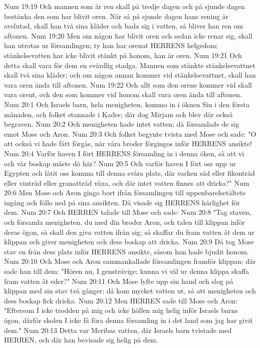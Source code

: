 Num 19:19  Och mannen som är ren skall på tredje dagen och på sjunde dagen bestänka den som har blivit oren. När så på sjunde dagen hans rening är avslutad, skall han två sina kläder och bada sig i vatten, så bliver han ren om aftonen.
Num 19:20  Men om någon har blivit oren och sedan icke renar sig, skall han utrotas ur församlingen; ty han har orenat HERRENS helgedom; stänkelsevatten har icke blivit stänkt på honom, han är oren.
Num 19:21  Och detta skall vara för dem en evärdlig stadga. Mannen som stänkte stänkelsevattnet skall två sina kläder; och om någon annan kommer vid stänkelsevattnet, skall han vara oren ända till aftonen.
Num 19:22  Och allt som den orene kommer vid skall vara orent, och den som kommer vid honom skall vara oren ända till aftonen.
Num 20:1  Och Israels barn, hela menigheten, kommo in i öknen Sin i den första månaden, och folket stannade i Kades; där dog Mirjam och blev där också begraven.
Num 20:2  Och menigheten hade intet vatten; då församlade de sig emot Mose och Aron.
Num 20:3  Och folket begynte tvista med Mose och sade: "O att också vi hade fått förgås, när våra broder förgingos inför HERRENS ansikte!
Num 20:4  Varför haven I fört HERRENS församling in i denna öken, så att vi och vår boskap måste dö här?
Num 20:5  Och varför haven I fört oss upp ur Egypten och låtit oss komma till denna svåra plats, där varken säd eller fikonträd eller vinträd eller granatträd växa, och där intet vatten finnes att dricka?"
Num 20:6  Men Mose och Aron gingo bort ifrån församlingen till uppenbarelsetältets ingång och föllo ned på sina ansikten. Då visade sig HERRENS härlighet för dem.
Num 20:7  Och HERREN talade till Mose och sade:
Num 20:8  "Tag staven, och församla menigheten, du med din broder Aron, och talen till klippan inför deras ögon, så skall den giva vatten ifrån sig; så skaffar du fram vatten åt dem ur klippan och giver menigheten och dess boskap att dricka.
Num 20:9  Då tog Mose stav en från dess plats inför HERRENS ansikte, såsom han hade bjudit honom.
Num 20:10  Och Mose och Aron sammankallade församlingen framför klippan; där sade han till dem: "Hören nu, I gensträvige; kunna vi väl ur denna klippa skaffa fram vatten åt eder?"
Num 20:11  Och Mose lyfte upp sin hand och slog på klippan med sin stav två gånger; då kom mycket vatten ut, så att menigheten och dess boskap fick dricka.
Num 20:12  Men HERREN sade till Mose och Aron: "Eftersom I icke trodden på mig och icke höllen mig helig inför Israels barns ögon, därför skolen I icke få föra denna församling in i det land som jag har givit dem."
Num 20:13  Detta var Meribas vatten, där Israels barn tvistade med HERREN, och där han bevisade sig helig på dem.
